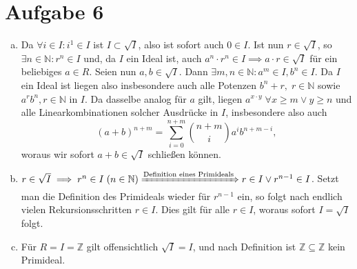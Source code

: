 \documentclass{article}
\theoremstyle{definition}
\newcommand{\N}{\mathbb{N}}
\newcommand{\Z}{\mathbb{Z}}
\begin{document}
\section*{Aufgabe 6}
\begin{enumerate}[(a)]
	\item Da $\forall i\in I: i^1\in I$ ist $I\subset \sqrt{I}$, also ist sofort auch $0 \in I$. Ist nun $r\in \sqrt{I}$, so $\exists n \in \N: r^n\in I$ und, da $I$ ein Ideal ist, auch $a^n\cdot r^n \in I\implies a\cdot r \in \sqrt{I}$ für ein beliebiges $a\in R$. Seien nun $a, b \in \sqrt{I}$. Dann $\exists m, n\in \N: a^m\in I, b^n \in I$. Da $I$ ein Ideal ist liegen also insbesondere auch alle Potenzen $b^n+r,\; r\in \N$ sowie $a^rb^n ,r\in \N$ in $I$. Da dasselbe analog für $a$ gilt, liegen $a^{x\cdot y}\; \forall x\geq m \lor y \geq n$ und alle Linearkombinationen solcher Ausdrücke in $I$, insbesondere also auch $$(a + b)^{n+m} = \sum_{i = 0}^{n+m}\binom{n+m}{i}a^ib^{n+m-i},$$ woraus wir sofort $a+b \in \sqrt{I}$ schließen können.
	\item $r\in \sqrt{I}\implies r^n\in I\; (n\in \N)\xRightarrow{\text{Definition eines Primideals}} r\in I\lor r^{n-1}\in I$. Setzt man die Definition des Primideals wieder für $r^{n-1}$ ein, so folgt nach endlich vielen Rekursionsschritten $r\in I$. Dies gilt für alle $r\in I$, woraus sofort $I = \sqrt{I}$ folgt.
	\item Für $R = I = \Z$ gilt offensichtlich $\sqrt{I} = I$, und nach Definition ist $\Z \subseteq \Z$ kein Primideal.
\end{enumerate}
\end{document}
